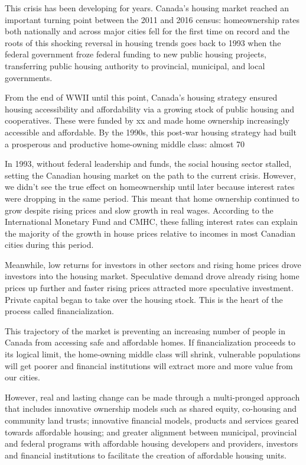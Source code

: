 This crisis has been developing for years. Canada's housing market reached an important turning point between the 2011 and 2016 census: homeownership rates both nationally and across major cities fell for the first time on record and the roots of this shocking reversal in housing trends goes back to 1993 when the federal government froze federal funding to new public housing projects, transferring public housing authority to provincial, municipal, and local governments. 

From the end of WWII until this point, Canada’s housing strategy ensured housing accessibility and affordability via a growing stock of public housing and cooperatives. These were funded by xx and made home ownership increasingly accessible and affordable. By the 1990s, this post-war housing strategy had built a prosperous and productive home-owning middle class: almost 70%

In 1993, without federal leadership and funds, the social housing sector stalled, setting the Canadian housing market on the path to the current crisis. However, we didn’t see the true effect on homeownership until later because interest rates were dropping in the same period. This meant that home ownership continued to grow despite rising prices and slow growth in real wages. According to the International Monetary Fund and CMHC, these falling interest rates can explain the majority of the growth in house prices relative to incomes in most Canadian cities during this period. 

Meanwhile, low returns for investors in other sectors and rising home prices drove investors into the housing market. Speculative demand drove already rising home prices up further and faster rising prices attracted more speculative investment. Private capital began to take over the housing stock. This is the heart of the process called financialization. 

This trajectory of the market is preventing an increasing number of people in Canada from accessing safe and affordable homes. If financialization proceeds to its logical limit, the home-owning middle class will shrink, vulnerable populations will get poorer and financial institutions will extract more and more value from our cities.

However, real and lasting change can be made through a multi-pronged approach that includes innovative ownership models such as shared equity, co-housing and community land trusts; innovative financial models, products and services geared towards affordable housing; and greater alignment between municipal, provincial and federal programs with affordable housing developers and providers, investors and financial institutions to facilitate the creation of affordable housing units.

